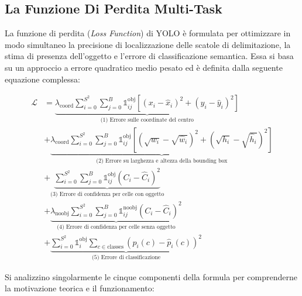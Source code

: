 ﻿\documentclass[11pt, a4paper]{article}
\begin{document}
\newpage

\subsection{La Funzione Di Perdita Multi-Task}

La funzione di perdita (\emph{Loss Function}) di YOLO è formulata per ottimizzare in modo simultaneo la precisione di localizzazione delle scatole di delimitazione, la stima di presenza dell'oggetto e l'errore di classificazione semantica. Essa si basa su un approccio a errore quadratico medio pesato ed è definita dalla seguente equazione complessa:

\begin{align*}
\mathcal{L} &= \underbrace{\lambda_{\text{coord}} \sum_{i=0}^{S^2} \sum_{j=0}^{B} \mathbb{1}_{ij}^{\text{obj}} \left[ (x_i - \hat{x}_i)^2 + (y_i - \hat{y}_i)^2 \right]}_{\text{(1) Errore sulle coordinate del centro}} \\
&+ \underbrace{\lambda_{\text{coord}} \sum_{i=0}^{S^2} \sum_{j=0}^{B} \mathbb{1}_{ij}^{\text{obj}} \left[ \left(\sqrt{w_i} - \sqrt{\hat{w}_i}\right)^2 + \left(\sqrt{h_i} - \sqrt{\hat{h}_i}\right)^2 \right]}_{\text{(2) Errore su larghezza e altezza della bounding box}} \\
&+ \underbrace{\sum_{i=0}^{S^2} \sum_{j=0}^{B} \mathbb{1}_{ij}^{\text{obj}} (C_i - \hat{C}_i)^2}_{\text{(3) Errore di confidenza per celle con oggetto}} \\
&+ \underbrace{\lambda_{\text{noobj}} \sum_{i=0}^{S^2} \sum_{j=0}^{B} \mathbb{1}_{ij}^{\text{noobj}} (C_i - \hat{C}_i)^2}_{\text{(4) Errore di confidenza per celle senza oggetto}} \\
&+ \underbrace{\sum_{i=0}^{S^2} \mathbb{1}_{i}^{\text{obj}} \sum_{c \in \text{classes}} (p_i(c) - \hat{p}_i(c))^2}_{\text{(5) Errore di classificazione}}
\end{align*}

Si analizzino singolarmente le cinque componenti della formula per comprenderne la motivazione teorica e il funzionamento:
\end{document}
